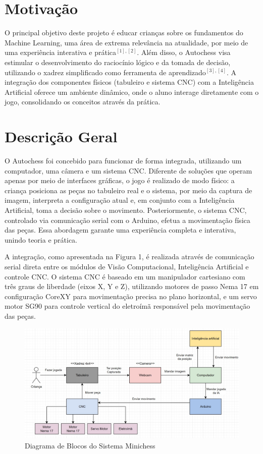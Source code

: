\documentclass[a4paper,12pt]{article}
\begin{document}
\section{Motivação}  
O principal objetivo deste projeto é educar crianças sobre os fundamentos do Machine Learning, uma área de extrema relevância na atualidade, por meio de uma experiência interativa e prática$^{[1], [2]}$. Além disso, o Autochess visa estimular o desenvolvimento do raciocínio lógico e da tomada de decisão, utilizando o xadrez simplificado como ferramenta de aprendizado$^{[3], [4]}$. A integração dos componentes físicos (tabuleiro e sistema CNC) com a Inteligência Artificial oferece um ambiente dinâmico, onde o aluno interage diretamente com o jogo, consolidando os conceitos através da prática.  

\section{Descrição Geral}  
O Autochess foi concebido para funcionar de forma integrada, utilizando um computador, uma câmera e um sistema CNC. Diferente de soluções que operam apenas por meio de interfaces gráficas, o jogo é realizado de modo físico: a criança posiciona as peças no tabuleiro real e o sistema, por meio da captura de imagem, interpreta a configuração atual e, em conjunto com a Inteligência Artificial, toma a decisão sobre o movimento. Posteriormente, o sistema CNC, controlado via comunicação serial com o Arduino, efetua a movimentação física das peças. Essa abordagem garante uma experiência completa e interativa, unindo teoria e prática.  

A integração, como apresentada na Figura 1, é realizada através de comunicação serial direta entre os módulos de Visão Computacional, Inteligência Artificial e controle CNC. O sistema CNC é baseado em um manipulador cartesiano com três graus de liberdade (eixos X, Y e Z), utilizando motores de passo Nema 17 em configuração CoreXY para movimentação precisa no plano horizontal, e um servo motor SG90 para controle vertical do eletroímã responsável pela movimentação das peças.  



\begin{figure}[H]  
    \centering  
    \includegraphics[width=1.0\textwidth]{images/diagrama.jpeg}   
    \caption{Diagrama de Blocos do Sistema Minichess}  
    \label{fig:diagrama}  
\end{figure}  
\end{document}
